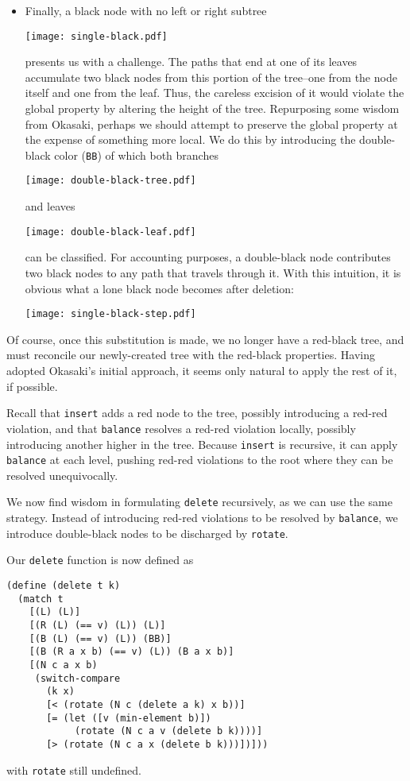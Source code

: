 \documentclass[preprint]{sigplanconf}
\begin{document}
\begin{itemize}
\item Finally, a black node with no left or right subtree
\begin{center}
\texttt{[image: single-black.pdf]}
\end{center}
presents us with a challenge. The paths that end at one of its leaves accumulate two black nodes from this portion of the tree--one from the node itself and one from the leaf. Thus, the careless excision of it would violate the global property by altering the height of the tree. Repurposing some wisdom from Okasaki, perhaps we should attempt to preserve the global property at the expense of something more local. We do this by introducing the double-black color (\texttt{BB}) of which both branches
\begin{center}
\texttt{[image: double-black-tree.pdf]}
\end{center}
and leaves
\begin{center}
\texttt{[image: double-black-leaf.pdf]}
\end{center}
can be classified. For accounting purposes, a double-black node contributes two black nodes to any path that travels through it. With this intuition, it is obvious what a lone black node becomes after deletion:
\begin{center}
\texttt{[image: single-black-step.pdf]}
\end{center}

\end{itemize}

Of course, once this substitution is made, we no longer have a red-black tree, and must reconcile our newly-created tree with the red-black properties. Having adopted Okasaki's initial approach, it seems only natural to apply the rest of it, if possible.

Recall that \texttt{insert} adds a red node to the tree, possibly introducing a red-red violation, and that \texttt{balance} resolves a red-red violation locally, possibly introducing another higher in the tree. Because \texttt{insert} is recursive, it can apply \texttt{balance} at each level, pushing red-red violations to the root where they can be resolved unequivocally.

We now find wisdom in formulating \texttt{delete} recursively, as we can use the same strategy. Instead of introducing red-red violations to be resolved by \texttt{balance}, we introduce double-black nodes to be discharged by \texttt{rotate}.

Our \texttt{delete} function is now defined as
\begin{verbatim}
(define (delete t k)
  (match t
    [(L) (L)]
    [(R (L) (== v) (L)) (L)]
    [(B (L) (== v) (L)) (BB)]
    [(B (R a x b) (== v) (L)) (B a x b)]
    [(N c a x b)
     (switch-compare
       (k x)
       [< (rotate (N c (delete a k) x b))]
       [= (let ([v (min-element b)])
            (rotate (N c a v (delete b k))))]
       [> (rotate (N c a x (delete b k)))])]))
\end{verbatim}
with \texttt{rotate} still undefined.
\end{document}
